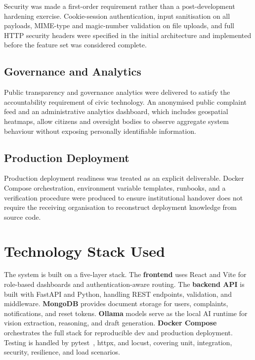 Security was made a first-order requirement rather than a post-development hardening exercise. Cookie-session authentication, input sanitisation on all payloads, MIME-type and magic-number validation on file uploads, and full HTTP security headers were specified in the initial architecture and implemented before the feature set was considered complete.

\subsection{Governance and Analytics}

Public transparency and governance analytics were delivered to satisfy the accountability requirement of civic technology. An anonymised public complaint feed and an administrative analytics dashboard, which includes geospatial heatmaps, allow citizens and oversight bodies to observe aggregate system behaviour without exposing personally identifiable information.

\subsection{Production Deployment}

Production deployment readiness was treated as an explicit deliverable. Docker Compose orchestration, environment variable templates, runbooks, and a verification procedure were produced to ensure institutional handover does not require the receiving organisation to reconstruct deployment knowledge from source code.

\section{Technology Stack Used}

The system is built on a five-layer stack. The \textbf{frontend} uses React and Vite for role-based dashboards and authentication-aware routing. The \textbf{backend API} is built with FastAPI and Python, handling REST endpoints, validation, and middleware. \textbf{MongoDB} provides document storage for users, complaints, notifications, and reset tokens. \textbf{Ollama} models serve as the local AI runtime for vision extraction, reasoning, and draft generation. \textbf{Docker Compose} orchestrates the full stack for reproducible dev and production deployment. Testing is handled by pytest~\cite{pytest_docs}, httpx, and locust, covering unit, integration, security, resilience, and load scenarios.

